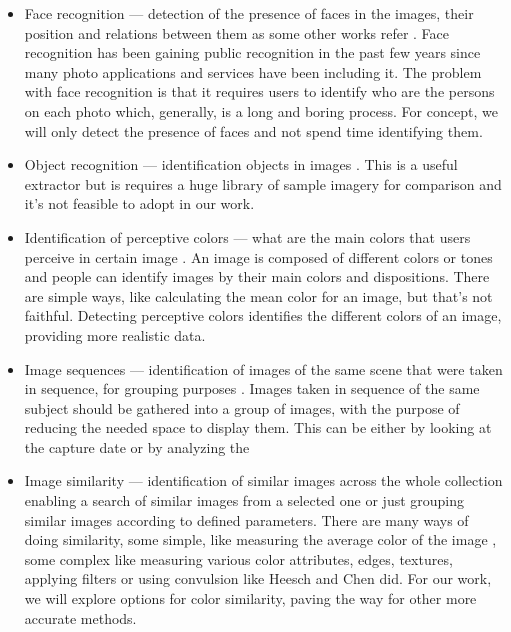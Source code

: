 \begin{itemize}
	\item Face recognition — detection of the presence of faces in the images, their position and relations between them as some other works refer \cite{Vasconcelos:2005in,Chen:2003p3699,Tamura:2002p859,Hsu:2002p3675}. Face recognition has been gaining public recognition in the past few years since many photo applications and services have been including it. The problem with face recognition is that it requires users to identify who are the persons on each photo which, generally, is a long and boring process. For concept, we will only detect the presence of faces and not spend time identifying them.

	\item Object recognition — identification objects in images \cite{Torralba:2008p527}. This is a useful extractor but is requires a huge library of sample imagery for comparison and it's not feasible to adopt in our work.
	
	
	\item Identification of perceptive colors — what are the main colors that users perceive in certain image \cite{Sural:2002bt,Tan:2001p850}. An image is composed of different colors or tones and people can identify images by their main colors and dispositions. There are simple ways, like calculating the mean color for an image, but that's not faithful. Detecting perceptive colors identifies the different colors of an image, providing more realistic data.

	\item Image sequences  —  identification of images of the same scene that were taken in sequence, for grouping purposes \cite{Cooper:2003p3679}. Images taken in sequence of the same subject should be gathered into a group of images, with the purpose of reducing the needed space to display them. This can be either by looking at the capture date or by analyzing the 

	\item Image similarity  —  identification of similar images across the whole collection enabling a search of similar images from a selected one or just grouping similar images according to defined parameters. There are many ways of doing similarity, some simple, like measuring the average color of the image \cite{Strong:2009p413,Qiu:2007p1207,Schaefer:2010p1871}, some complex like measuring various color attributes, edges, textures, applying filters or using convulsion like Heesch \cite{Heesch:2004p2675} and Chen \cite{Chen:1998p2344} did. For our work, we will explore options for color similarity, paving the way for other more accurate methods.
\end{itemize}

